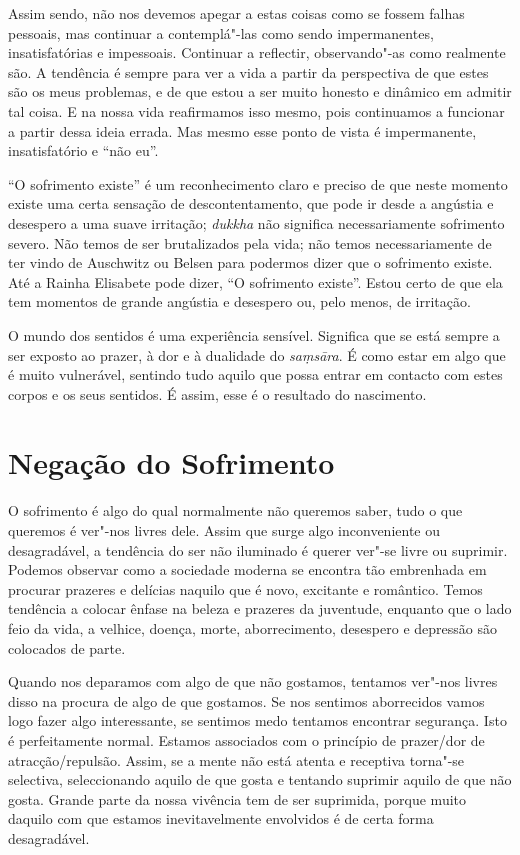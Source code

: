 Assim sendo, não nos devemos apegar a estas coisas como se fossem falhas
pessoais, mas continuar a contemplá"-las como sendo impermanentes,
insatisfatórias e impessoais. Continuar a reflectir, observando"-as como
realmente são. A tendência é sempre para ver a vida a partir da perspectiva de
que estes são os meus problemas, e de que estou a ser muito honesto e dinâmico
em admitir tal coisa. E na nossa vida reafirmamos isso mesmo, pois continuamos a
funcionar a partir dessa ideia errada. Mas mesmo esse ponto de vista é
impermanente, insatisfatório e “não eu”.

“O sofrimento existe” é um reconhecimento claro e preciso de que neste momento
existe uma certa sensação de descontentamento, que pode ir desde a angústia e
desespero a uma suave irritação; \emph{dukkha} não significa necessariamente
sofrimento severo. Não temos de ser brutalizados pela vida; não temos
necessariamente de ter vindo de Auschwitz ou Belsen para podermos dizer que o
sofrimento existe. Até a Rainha Elisabete pode dizer, “O sofrimento existe”.
Estou certo de que ela tem momentos de grande angústia e desespero ou, pelo
menos, de irritação.

O mundo dos sentidos é uma experiência sensível. Significa que se está sempre a
ser exposto ao prazer, à dor e à dualidade do \emph{saṃsāra}. É como estar em
algo que é muito vulnerável, sentindo tudo aquilo que possa entrar em contacto
com estes corpos e os seus sentidos. É assim, esse é o resultado do nascimento.

\section{Negação do Sofrimento}

O sofrimento é algo do qual normalmente não queremos saber, tudo o que queremos é
ver"-nos livres dele. Assim que surge algo inconveniente ou desagradável, a
tendência do ser não iluminado é querer ver"-se livre ou suprimir. Podemos
observar como a sociedade moderna se encontra tão embrenhada em procurar
prazeres e delícias naquilo que é novo, excitante e \mbox{romântico}. Temos tendência a
colocar ênfase na beleza e prazeres da juventude, enquanto que o lado feio da
vida, a velhice, doença, morte, aborrecimento, desespero e depressão são
colocados de parte.

Quando nos deparamos com algo de que não gostamos, tentamos
ver"-nos livres disso na procura de algo de que gostamos. Se nos sentimos
aborrecidos vamos logo fazer algo interessante, se sentimos medo tentamos
encontrar segurança. Isto é perfeitamente normal. Estamos associados com o
princípio de prazer/dor de atracção/repulsão. Assim, se a mente não está atenta
e receptiva torna"-se selectiva, seleccionando aquilo de que gosta e tentando
suprimir aquilo de que não gosta. Grande parte da nossa vivência tem de ser
suprimida, porque muito daquilo com que estamos inevitavelmente envolvidos é de
certa forma desagradável.

